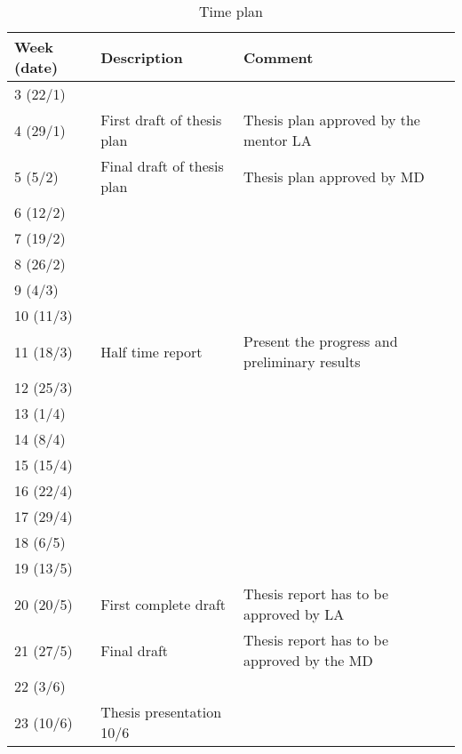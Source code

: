 \begin{table}[hbtp]
\caption{Time plan}
\begin{tabular}{|l|p{}|p{6cm}|}
	\hline
	\textbf{Week (date)} & \textbf{Description}       & \textbf{Comment}                             \\ \hline
	3 (22/1)             &                            &  \\ \hline
	4 (29/1)             & First draft of thesis plan & Thesis plan approved by the mentor LA        \\ \hline
	5 (5/2)              & Final draft of thesis plan & Thesis plan approved by MD                   \\ \hline
	6 (12/2)             &                            &  \\ \hline
	7 (19/2)             &                            &  \\ \hline
	8 (26/2)             &                            &  \\ \hline
	9 (4/3)              &                            &  \\ \hline
	10 (11/3)            &                            &  \\ \hline
	11 (18/3)            & Half time report           & Present the progress and preliminary results \\ \hline
	12 (25/3)            &                            &  \\ \hline
	13 (1/4)             &                            &  \\ \hline
	14 (8/4)             &                            &  \\ \hline
	15 (15/4)            &                            &  \\ \hline
	16 (22/4)            &                            &  \\ \hline
	17 (29/4)            &                            &  \\ \hline
	18 (6/5)             &                            &  \\ \hline
	19 (13/5)            &                            &  \\ \hline
	20 (20/5)            & First complete draft       & Thesis report has to be approved by LA       \\ \hline
	21 (27/5)            & Final draft                & Thesis report has to be approved by the MD   \\ \hline
	22 (3/6)             &                            &  \\ \hline
	23 (10/6)            & Thesis presentation 10/6   &  \\ \hline
\end{tabular}

\end{table}